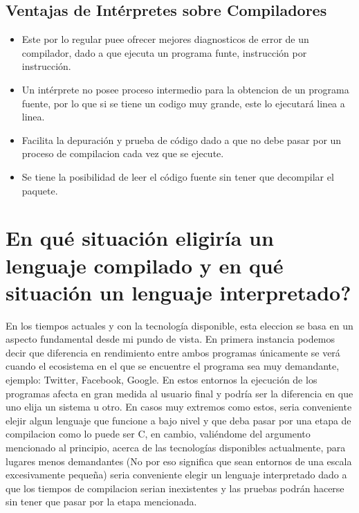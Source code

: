 \documentclass{article}
\begin{document}
\subsection{Ventajas de Int\'erpretes sobre Compiladores}\cite{comppth} \cite{comintp}
\begin{itemize}
\item Este por lo regular puee ofrecer mejores diagnosticos de error de un compilador, dado a que ejecuta un programa funte, instrucci\'on por instrucci\'on.
\item Un int\'erprete no posee proceso intermedio para la obtencion de un programa fuente, por lo que si se tiene un codigo muy grande, este lo ejecutar\'a linea a linea.
\item Facilita la depuraci\'on y prueba de c\'odigo dado a que no debe pasar por un proceso de compilacion cada vez que se ejecute.
\item Se tiene la posibilidad de leer el c\'odigo fuente sin tener que decompilar el paquete.
\end{itemize}

\section{{\textquestiondown}En qu\'e situaci\'on eligir\'ia un lenguaje compilado y en qu\'e situaci\'on un lenguaje interpretado?}

En los tiempos actuales y con la tecnolog\'ia disponible, esta eleccion se basa en un aspecto fundamental desde mi pundo de vista. En primera instancia podemos decir que diferencia en rendimiento entre ambos programas \'unicamente se ver\'a cuando el ecosistema en el que se encuentre el programa sea muy demandante, ejemplo: Twitter, Facebook, Google. En estos entornos la ejecuci\'on de los programas afecta en gran medida al usuario final y podr\'ia ser la diferencia en que uno elija un sistema u otro. En casos muy extremos como estos, seria conveniente elejir algun lenguaje que funcione a bajo nivel y que deba pasar por una etapa de compilacion como lo puede ser C, en cambio, vali\'endome del argumento mencionado al principio, acerca de las tecnolog\'ias disponibles actualmente, para lugares menos demandantes (No por eso significa que sean entornos de una escala excesivamente peque\~{n}a) seria conveniente elegir un lenguaje interpretado dado a que los tiempos de compilacion serian inexistentes y las pruebas podr\'an hacerse sin tener que pasar por la etapa mencionada.
\end{document}
